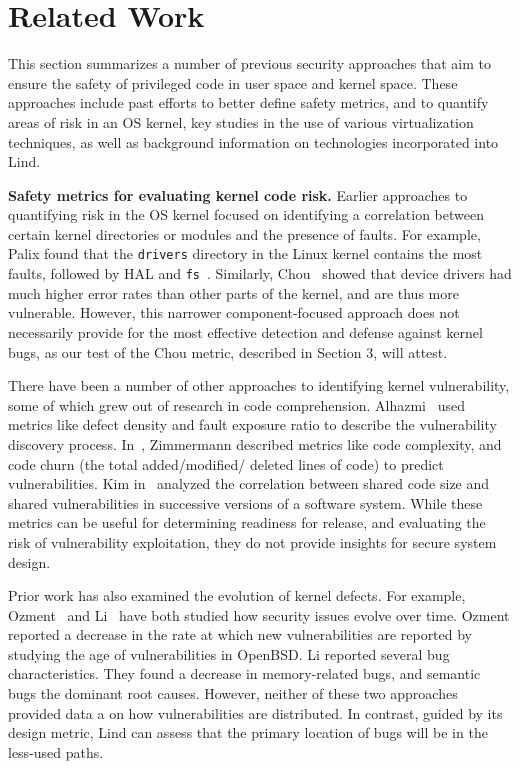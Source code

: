 \section{Related Work}
\label{sec.related_work}

This section summarizes a number of previous security approaches
that aim to ensure the safety of privileged code in user space and kernel space.
These approaches include past efforts to better define safety metrics, and to quantify
areas of risk in an OS kernel, key studies in the use of various virtualization
 techniques, as well as background information on technologies incorporated into
 Lind.

\textbf{Safety metrics for evaluating kernel code risk.}
Earlier approaches to quantifying risk
in the OS kernel focused on identifying a correlation between certain
kernel directories or modules and the presence of faults. For example,
Palix found that the \texttt{drivers} directory in the Linux kernel contains the
most faults, followed by HAL and \texttt{fs}~\cite{palix2011faults}. Similarly,
Chou~\cite{PittSFIeld} showed that device drivers had
much higher error rates than other parts of the kernel, and are thus more vulnerable.
However, this narrower component-focused approach does not necessarily
provide for the most effective detection and defense against kernel bugs, as our
test of the Chou metric, described in Section 3, will attest.

There have been a number of other approaches to identifying kernel vulnerability, some of
which grew out of research in code comprehension.  Alhazmi~\cite{alhazmi2008application}
used metrics like defect density and fault exposure ratio to describe the
vulnerability discovery process. In~\cite{zimmermann2010searching}, Zimmermann
described metrics like code complexity, and code churn (the total added/modified/
deleted lines of code) to predict vulnerabilities. Kim in~\cite{kim2007vulnerability} analyzed
the correlation between shared code size and shared vulnerabilities in
successive versions of a software system. While
these metrics can be useful for determining readiness for release, and
evaluating the risk of vulnerability exploitation,
they do not provide insights for secure system design.

Prior work has also examined the evolution of kernel defects. For example,
Ozment~\cite{ozment2006milk} and Li~\cite{li2006have} have
both studied how security issues evolve over
time. Ozment reported a decrease in the rate at which new vulnerabilities
are reported by studying the age of vulnerabilities in OpenBSD. 
Li reported several bug characteristics. They found a decrease in memory-related 
bugs, and semantic bugs the dominant root causes.  
However, neither of these two approaches provided data
a on how vulnerabilities are distributed.
In contrast, guided by its design metric, Lind can assess that the primary location
of bugs will be in the less-used paths.

